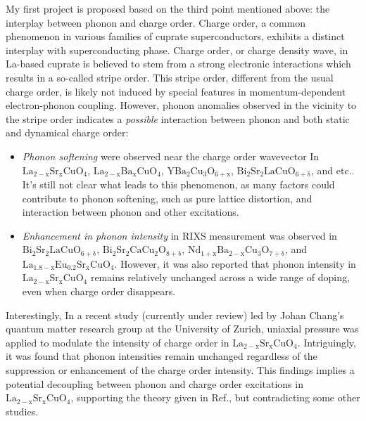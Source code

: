 \documentclass[11pt]{article}
\begin{document}
My first project is proposed based on the third point mentioned above: the interplay between phonon and charge order. Charge order, a common phenomenon in various families of cuprate superconductors, exhibits a distinct interplay with superconducting phase. Charge order, or charge density wave, in La-based cuprate is believed to stem from a strong electronic interactions which results in a so-called stripe order\cite{harriger_stripe_nodate,tranquada_evidence_1995,choi_disentangling_2020}. This stripe order, different from the usual charge order, is likely not induced by special features in momentum-dependent electron-phonon coupling. However, phonon anomalies observed in the vicinity to the stripe order indicates a \textit{possible} interaction between phonon and both static and dynamical charge order: 
\begin{itemize}
\item \textit{Phonon softening}  were observed near the charge order wavevector In $\mathrm{La_{2-x}Sr_{x}CuO_{4}}$\cite{lin_strongly_2020, wang_charge_2021, huang_quantum_2021}, $\mathrm{La_{2-x}Ba_{x}CuO_{4}}$\cite{miao_incommensurate_2018}, $\mathrm{YBa_{2}Cu_{3}O_{6+x}}$\cite{tacon_inelastic_2014}, $\mathrm{Bi_{2}Sr_{2}LaCuO_{6+\delta}}$\cite{li_multiorbital_2020}, and etc.. It's still not clear what leads to this phenomenon, as many factors could contribute to phonon softening, such as pure lattice distortion\cite{lin_strongly_2020}, and interaction between phonon and other excitations.  
\item \textit{Enhancement in phonon intensity}  in RIXS measurement was observed in $\mathrm{Bi_{2}Sr_{2}LaCuO_{6+\delta}}$\cite{li_multiorbital_2020}, $\mathrm{Bi_{2}Sr_{2}CaCu_{2}O_{8+\delta}}$\cite{chaix_dispersive_2017}, $\mathrm{Nd_{1+x}Ba_{2-x}Cu_{3}O_{7+\delta}}$\cite{braicovich_determining_2020}, and $\mathrm{La_{1.8-x}Eu_{0.2}Sr_xCuO_{4}}$\cite{peng_enhanced_2020,wang_charge_2021,huang_quantum_2021}. However, it was also reported that phonon intensity in $\mathrm{La_{2-x}Sr_{x}CuO_{4}}$ remains relatively unchanged across a wide range of doping, even when charge order disappears\cite{lin_strongly_2020}.  
\end{itemize}

Interestingly, In a recent study (currently under review) led by Johan Chang's quantum matter research group at the University of Zurich, uniaxial pressure was applied to modulate the intensity of charge order in $\mathrm{La_{2-x}Sr_{x}CuO_{4}}$. Intriguingly, it was found that phonon intensities remain unchanged regardless of the suppression or enhancement of the charge order intensity. This findings implies a potential decoupling between phonon and charge order excitations in $\mathrm{La_{2-x}Sr_{x}CuO_{4}}$, supporting the theory given in Ref.\cite{lin_strongly_2020}, but contradicting some other studies\cite{li_multiorbital_2020, chaix_dispersive_2017,huang_quantum_2021}. 
\end{document}
